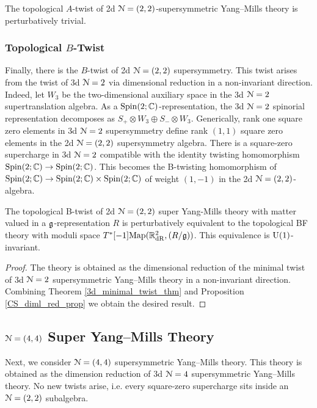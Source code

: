 \documentclass[10pt, oneside]{article}
\begin{document}
\begin{corollary}
The topological $A$-twist of 2d $\mathcal N=(2,2)$-supersymmetric Yang--Mills theory is perturbatively trivial.
\end{corollary}

\subsubsection{Topological $B$-Twist} \label{sect:2d22Btwist}

Finally, there is the $B$-twist of 2d $\mathcal N=(2,2)$ supersymmetry.
This twist arises from the twist of 3d $\mathcal N=2$ via dimensional reduction in a non-invariant direction.  
Indeed, let $W_3$ be the two-dimensional auxiliary space in the 3d $\mathcal{N}=2$ supertranslation algebra.  
As a $\mathrm{Spin}(2;\mathbb C)$-representation, the 3d $\mathcal N=2$ spinorial representation decomposes as $S_+ \otimes W_3 \oplus S_- \otimes W_3$.
Generically, rank one square zero elements in 3d $\mathcal{N}=2$ supersymmetry define rank $(1,1)$ square zero elements in the 2d $\mathcal{N}=(2,2)$ supersymmetry algebra.  
There is a square-zero supercharge in 3d $\mathcal{N}=2$ compatible with the identity twisting homomorphism $\mathrm{Spin}(2;\mathbb C) \to \mathrm{Spin}(2;\mathbb C)$.  This becomes the B-twisting homomorphism of $\mathrm{Spin}(2;\mathbb C) \to \mathrm{Spin}(2;\mathbb C) \times \mathrm{Spin}(2;\mathbb C)$ of weight $(1,-1)$ in the 2d $\mathcal{N}=(2,2)$-algebra.

\begin{theorem} \label{2d_2_B_twist_thm}
The topological B-twist of 2d $\mathcal{N}=(2,2)$ super Yang-Mills theory with matter valued in a $\mathfrak g$-representation $R$ is perturbatively equivalent to the topological BF theory with moduli space $T^*[-1]\mathrm{Map}(\mathbb R^2_{\mathrm{dR}}, (R/\mathfrak{g}))$.  This equivalence is $\mathrm{U}(1)$-invariant.
\end{theorem}

\begin{proof}
The theory is obtained as the dimensional reduction of the minimal twist of 3d $\mathcal{N}=2$ supersymmetric Yang--Mills theory in a non-invariant direction.  
Combining Theorem \ref{3d_minimal_twist_thm} and Proposition \ref{CS_diml_red_prop} we obtain the desired result.
\end{proof}

\subsection{\texorpdfstring{$\mathcal N=(4,4)$}{N=(4,4)} Super Yang--Mills Theory} \label{sect:2d(4,4)}
Next, we consider $\mathcal{N}=(4,4)$ supersymmetric Yang--Mills theory.
This theory is obtained as the dimension reduction of 3d $\mathcal{N}=4$ supersymmetric Yang--Mills theory.  
No new twists arise, i.e. every square-zero supercharge sits inside an $\mathcal{N}=(2,2)$ subalgebra.
\end{document}
